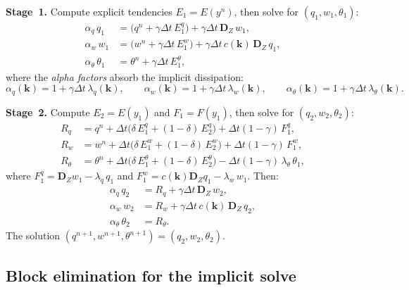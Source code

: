 \documentclass[11pt]{article}
\newcommand{\Dvec}{\bm{D}}
\begin{document}
\noindent\textbf{Stage~1.} Compute explicit tendencies $E_1 = E(y^n)$, then solve for $(q_1, w_1, \theta_1)$:
\begin{align}
\alpha_q\,q_1 &= \big(q^n + \gamma\Delta t\,E_1^q\big) + \gamma\Delta t\,\Dvec_Z\,w_1, \label{eq:stage1_q}\\
\alpha_w\,w_1 &= \big(w^n + \gamma\Delta t\,E_1^w\big) + \gamma\Delta t\,c(\bm{k})\,\Dvec_Z\,q_1, \label{eq:stage1_w}\\
\alpha_\theta\,\theta_1 &= \theta^n + \gamma\Delta t\,E_1^\theta, \label{eq:stage1_th}
\end{align}
where the \emph{alpha factors} absorb the implicit dissipation:
\begin{equation}
\boxed{
\alpha_q(\bm{k}) = 1 + \gamma\Delta t\,\lambda_q(\bm{k}), \qquad
\alpha_w(\bm{k}) = 1 + \gamma\Delta t\,\lambda_w(\bm{k}), \qquad
\alpha_\theta(\bm{k}) = 1 + \gamma\Delta t\,\lambda_\theta(\bm{k}).
}
\label{eq:alpha_factors}
\end{equation}

\noindent\textbf{Stage~2.} Compute $E_2 = E(y_1)$ and $F_1 = F(y_1)$, then solve for $(q_2, w_2, \theta_2)$:
\begin{align}
R_q &= q^n + \Delta t\big(\delta\,E_1^q + (1-\delta)\,E_2^q\big) + \Delta t(1-\gamma)\,F_1^q, \label{eq:stage2_Rq}\\
R_w &= w^n + \Delta t\big(\delta\,E_1^w + (1-\delta)\,E_2^w\big) + \Delta t(1-\gamma)\,F_1^w, \\
R_\theta &= \theta^n + \Delta t\big(\delta\,E_1^\theta + (1-\delta)\,E_2^\theta\big) - \Delta t(1-\gamma)\,\lambda_\theta\,\theta_1, \label{eq:stage2_Rth}
\end{align}
where $F_1^q = \Dvec_Z w_1 - \lambda_q\,q_1$ and $F_1^w = c(\bm{k})\Dvec_Z q_1 - \lambda_w\,w_1$.
Then:
\begin{align}
\alpha_q\,q_2 &= R_q + \gamma\Delta t\,\Dvec_Z\,w_2, \\
\alpha_w\,w_2 &= R_w + \gamma\Delta t\,c(\bm{k})\,\Dvec_Z\,q_2, \\
\alpha_\theta\,\theta_2 &= R_\theta. \label{eq:stage2_th}
\end{align}
The solution $(q^{n+1}, w^{n+1}, \theta^{n+1}) = (q_2, w_2, \theta_2)$.

\subsection{Block elimination for the implicit solve}
\label{sec:block_elim}
\end{document}
